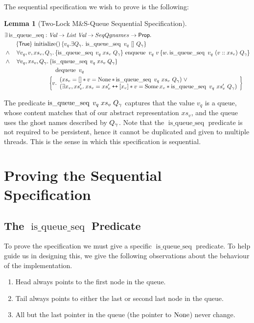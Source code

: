 \documentclass[twoside,11pt,openright]{report}
\newtheorem{lemma}[theorem]{Lemma}
\newcommand{\initialise}{\operatorname{initialize}}
\newcommand{\enqueue}{\operatorname{enqueue}}
\newcommand{\dequeue}{\operatorname{dequeue}}
\newcommand{\isqueueseq}{\operatorname{is\_queue\_seq}}
\newcommand\catenate{\mathbin{\text{\ttfamily\upshape ++}}}
\begin{document}
The sequential specification we wish to prove is the following:
\begin{lemma}[Two-Lock M\&S-Queue Sequential Specification]\label{TLMSQ:spec:seq}
\begin{align*}
  &\Exists \isqueueseq : \Val \to \List \ \Val \to SeqQgnames \to \Prop.\\
  &\quad\quad\hoare{\TRUE}{\initialise \TT}{v_q . \Exists Q_\gname. \isqueueseq\ v_q\ []\ Q_\gname}\\
  &\land\quad\All v_q, v, xs_v, Q_\gname. \hoare{\isqueueseq \; v_q \; xs_v \; Q_\gname}{\enqueue\ v_q\ v}{w . \isqueueseq\ v_q\ (v :: xs_v)\ Q_\gname}\\
  &\land\quad\All v_q, xs_v, Q_\gname. \hoareV[t]{\isqueueseq \; v_q \; xs_v \; Q_\gname}{\dequeue\ v_q}{v . \begin{array}{l}(xs_v = [] \star v = \None \star \isqueueseq\ v_q\ xs_v\ Q_\gname) \; \lor\\ (\Exists x_v, xs_v' . xs_v = xs_v' \catenate [x_v] \star v = \Some x_v \star \isqueueseq\ v_q\ xs_v'\ Q_\gname) \end{array}}
\end{align*}
\end{lemma}

The predicate $\isqueueseq \; v_q \; xs_v \; Q_\gname$ captures that the value $v_q$ is a queue, whose content matches that of our abstract representation $xs_v$, and the queue uses the ghost names described by $Q_\gamma$. Note that the $\isqueueseq$ predicate is not required to be persistent, hence it cannot be duplicated and given to multiple threads. This is the sense in which this specification is sequential.

\section{Proving the Sequential Specification}
\subsection[The isqueueseq predicate]{The $\isqueueseq$ Predicate}
To prove the specification we must give a specific $\isqueueseq$ predicate. To help guide us in designing this, we give the following observations about the behaviour of the implementation.
\begin{enumerate}
  \item\label{TLMSQ:insights:head} Head always points to the first node in the queue.
  \item\label{TLMSQ:insights:tail} Tail always points to either the last or second last node in the queue.
  \item\label{TLMSQ:insights:persistent} All but the last pointer in the queue (the pointer to $\operatorname{None}$) never change.
\end{enumerate}
\end{document}
